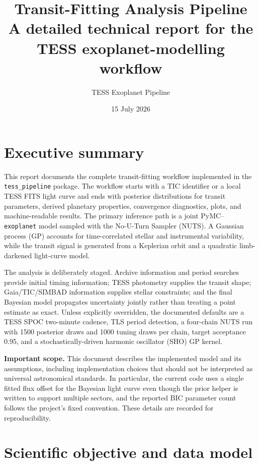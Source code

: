 \documentclass[12pt,a4paper,oneside]{report}
\title{\textbf{Transit-Fitting Analysis Pipeline}\\[0.5em]
\large A detailed technical report for the TESS exoplanet-modelling workflow}
\author{TESS Exoplanet Pipeline}\date{15 July 2026}
\newcommand{\code}[1]{\texttt{\small #1}}
\begin{document}
\maketitle
{}
\tableofcontents
\clearpage
{}

\chapter*{Executive summary}
This report documents the complete transit-fitting workflow implemented in the
\code{tess\_pipeline} package. The workflow starts with a TIC identifier or a
local TESS FITS light curve and ends with posterior distributions for transit
parameters, derived planetary properties, convergence diagnostics, plots, and
machine-readable results. The primary inference path is a joint PyMC--
\code{exoplanet} model sampled with the No-U-Turn Sampler (NUTS). A Gaussian
process (GP) accounts for time-correlated stellar and instrumental variability,
while the transit signal is generated from a Keplerian orbit and a quadratic
limb-darkened light-curve model.

The analysis is deliberately staged. Archive information and period searches
provide initial timing information; TESS photometry supplies the transit shape;
Gaia/TIC/SIMBAD information supplies stellar constraints; and the final
Bayesian model propagates uncertainty jointly rather than treating a point
estimate as exact. Unless explicitly overridden, the documented defaults are a
TESS SPOC two-minute cadence, TLS period detection, a four-chain NUTS run with
1500 posterior draws and 1000 tuning draws per chain, target acceptance 0.95,
and a stochastically-driven harmonic oscillator (SHO) GP kernel.

\textbf{Important scope.} This document describes the implemented model and its
assumptions, including implementation choices that should not be interpreted as
universal astronomical standards. In particular, the current code uses a
single fitted flux offset for the Bayesian light curve even though the prior
helper is written to support multiple sectors, and the reported BIC parameter
count follows the project's fixed convention. These details are recorded for
reproducibility.

\chapter{Scientific objective and data model}
\end{document}
